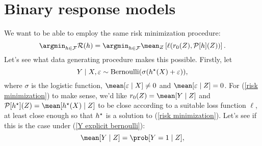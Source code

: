 \section{Binary response models}
We want to be able to employ the same risk minimization procedure:
\begin{equation}
    \label{risk minimization}
    \argmin_{ h \in \mathcal{F} } \risk ( h )
    = \argmin_{ h \in \mathcal{F} } \mean_{ Z } \left[
        \ell ( r_{ 0 } ( Z ), \meanop [ h ] ( Z ) )
    \right]
.\end{equation}
Let's see what data generating procedure makes this possible.
Firstly, let
\begin{equation}
    \label{Y explicit bernoulli}
    Y \mid X, \varepsilon \sim \operatorname{Bernoulli} ( \sigma ( h^{ \star } ( X ) + \varepsilon ) )
,\end{equation}
where $ \sigma $ is the logistic function, $ \mean [ \varepsilon \mid X ] \neq 0 $ and $ \mean [ \varepsilon \mid Z ] = 0 $.
For (\ref{risk minimization}) to make sense, we'd like $ r_{ 0 } ( Z ) = \mean [ Y \mid Z ] $ and $ \meanop [ \hstar ] ( Z ) = \mean [ \hstar ( X ) \mid Z ] $ to be close according to a suitable loss function $ \ell $, at least close enough so that $ h^{ \star } $ is a solution to (\ref{risk minimization}).
Let's see if this is the case under (\ref{Y explicit bernoulli}):
\begin{equation*}
    \mean [ Y \mid Z ] = \prob [ Y = 1 \mid Z ]
,\end{equation*}

